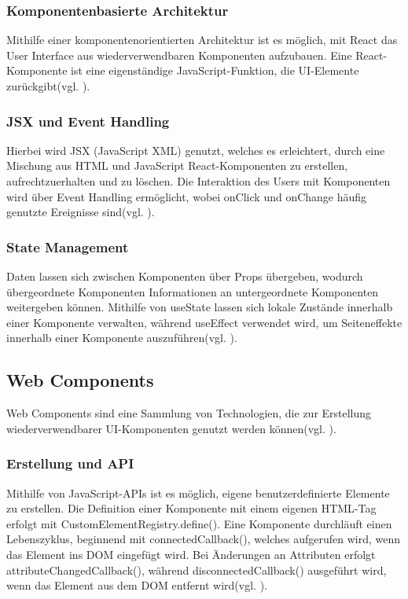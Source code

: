 \documentclass[oneside]{ausarbeitung}
\begin{document}
\subsubsection{Komponentenbasierte Architektur}
Mithilfe einer komponentenorientierten Architektur ist es möglich, mit React das User Interface aus wiederverwendbaren Komponenten aufzubauen. Eine React-Komponente ist eine eigenständige JavaScript-Funktion, die UI-Elemente zurückgibt(vgl. \parencite{react}).

\subsubsection{JSX und Event Handling}
Hierbei wird JSX (JavaScript XML) genutzt, welches es erleichtert, durch eine Mischung aus HTML und JavaScript React-Komponenten zu erstellen, aufrechtzuerhalten und zu löschen. Die Interaktion des Users mit Komponenten wird über Event Handling ermöglicht, wobei onClick und onChange häufig genutzte Ereignisse sind(vgl. \parencite{react}).

\subsubsection{State Management}
Daten lassen sich zwischen Komponenten über Props übergeben, wodurch übergeordnete Komponenten Informationen an untergeordnete Komponenten weitergeben können. Mithilfe von useState lassen sich lokale Zustände innerhalb einer Komponente verwalten, während useEffect verwendet wird, um Seiteneffekte innerhalb einer Komponente auszuführen(vgl. \parencite{react}).

\subsection{Web Components}
Web Components sind eine Sammlung von Technologien, die zur Erstellung wiederverwendbarer UI-Komponenten genutzt werden können(vgl. \parencite{webcomponents}). 

\subsubsection{Erstellung und API}
Mithilfe von JavaScript-APIs ist es möglich, eigene benutzerdefinierte Elemente zu erstellen. Die Definition einer Komponente mit einem eigenen HTML-Tag erfolgt mit CustomElementRegistry.define(). Eine Komponente durchläuft einen Lebenszyklus, beginnend mit connectedCallback(), welches aufgerufen wird, wenn das Element ins DOM eingefügt wird. Bei Änderungen an Attributen erfolgt attributeChangedCallback(), während disconnectedCallback() ausgeführt wird, wenn das Element aus dem DOM entfernt wird(vgl. \parencite{webcomponents}).
\end{document}
